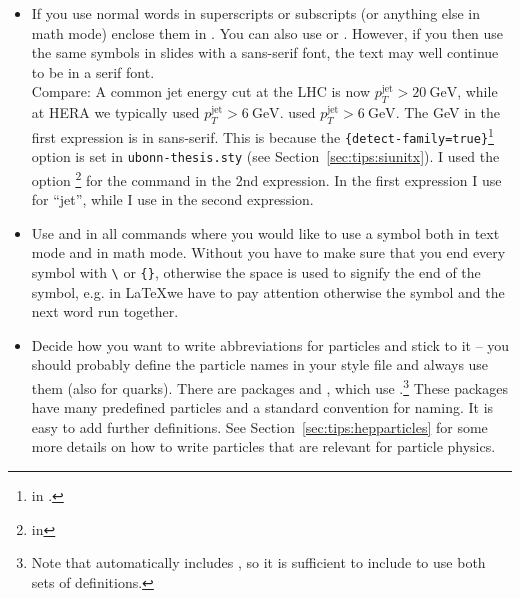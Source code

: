 \begin{itemize}
\item If you use normal words in superscripts or subscripts (or
  anything else in math mode) enclose them in . You can
  also use  or . However, if you then use
  the same symbols in slides with a sans-serif font, the text may well
  continue to be in a
  serif font.\\
  {\sffamily Compare: A common jet energy cut at the LHC is now
    $p_{T}^{\text{jet}} > \SI{20}{\GeV}$, while at HERA we typically
     {%
      used $p_{T}^{\mathrm{jet}} > \SI[obeyfamily=false]{6}{\GeV}$.
    }{%
      used $p_{T}^{\mathrm{jet}} > \SI[detect-family=false]{6}{\GeV}$.
    }}
  The \si{\GeV} in the first expression is in sans-serif. This is
  because the
  \texttt{\{detect-family=true\}}\footnote{
    in .} option is set in \texttt{ubonn-thesis.sty}
  (see Section~\ref{sec:tips:siunitx}).  I used the option
  \footnote{ in } for the  command in the 2nd expression.
  In the first expression I use  for \enquote{jet}, while
  I use  in the second expression.
  
\item Use  and
   in all commands where you would
  like to use a symbol both in text mode and in math mode. Without
   you have to make sure that you end every symbol with
  \texttt{\textbackslash} or \texttt{\{\}}, otherwise the space is used
  to signify the end of the symbol, e.g. in \LaTeX we have to pay
  attention otherwise the symbol and the next word run together.

\item Decide how you want to write abbreviations for particles and
  stick to it -- you should probably define the particle names in your
  style file and always use them (also for quarks).
  There are packages  and ,
  which use .\footnote{%
    Note that  automatically includes ,
    so it is sufficient to include  to use both sets of definitions.}
  These packages have many predefined particles and a standard convention for naming.
  It is easy to add further definitions.
  See Section~\ref{sec:tips:hepparticles} for some more details on how to write particles
  that are relevant for particle physics.


\end{itemize}
